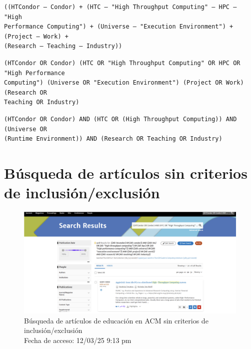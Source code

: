 \begin{tcolorbox}[
		colback=gray!5,
		colframe=black!60,
		title=Cadena de búsqueda en Springer,
		fonttitle=\bfseries,
		sharp corners=south
	]
	\scriptsize
	\begin{verbatim}
((HTCondor — Condor) + (HTC — "High Throughput Computing" — HPC — "High
Performance Computing") + (Universe — "Execution Environment") + (Project — Work) +
(Research — Teaching — Industry))
	\end{verbatim}
\end{tcolorbox}

\begin{tcolorbox}[
		colback=gray!5,
		colframe=black!60,
		title=Cadena de búsqueda en ScienceDirect,
		fonttitle=\bfseries,
		sharp corners=south
	]
	\scriptsize
	\begin{verbatim}
(HTCondor OR Condor) (HTC OR "High Throughput Computing" OR HPC OR "High Performance
Computing") (Universe OR "Execution Environment") (Project OR Work) (Research OR
Teaching OR Industry)
	\end{verbatim}
\end{tcolorbox}

\begin{tcolorbox}[
		colback=gray!5,
		colframe=black!60,
		title=Cadena de búsqueda en Taylor \& Francis,
		fonttitle=\bfseries,
		sharp corners=south
	]
	\scriptsize
	\begin{verbatim}
(HTCondor OR Condor) AND (HTC OR (High Throughput Computing)) AND (Universe OR
(Runtime Environment)) AND (Research OR Teaching OR Industry)
  \end{verbatim}
\end{tcolorbox}


\section{Búsqueda de artículos sin criterios de inclusión/exclusión}\label{sec:busqueda-sin-criterios}


\begin{figure}[H]
	\centering
	\includegraphics[width=\textwidth,keepaspectratio]{apendices/bases-datos/sin-exclusion/acm.png}
	\caption{Búsqueda de artículos de educación en ACM sin criterios de inclusión/exclusión \\
		Fecha de acceso: 12/03/25 9:13 pm
	}\label{fig:busqueda-acm-no-exclusion}
\end{figure}

